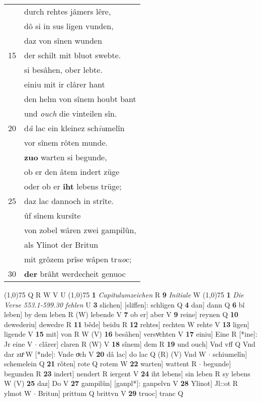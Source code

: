 \documentclass[8pt,a4paper,notitlepage]{article}
\begin{document}
\begin{table}[ht]
\begin{minipage}[t]{0.5\linewidth}
\begin{tabular}{rl}
 & durch rehtes jâmers lêre,\\ 
 & dô si in sus ligen vunden,\\ 
 & daz von sînen wunden\\ 
15 & der schilt mit bluot swebte.\\ 
 & si besâhen, ober lebte.\\ 
 & einiu mit ir clârer hant\\ 
 & den helm von sînem houbt bant\\ 
 & und \textit{ouch} die vinteilen sîn.\\ 
20 & d\textit{â} lac ein kleinez sch\textit{iu}melîn\\ 
 & vor sînem rôten munde.\\ 
 & \textbf{zuo} warten si begunde,\\ 
 & ob er den âtem indert züge\\ 
 & oder ob er \textbf{iht} lebens trüge;\\ 
25 & daz lac dannoch in strîte.\\ 
 & ûf sînem kursîte\\ 
 & von zobel wâren zwei gampilûn,\\ 
 & als Ylinot der Britun\\ 
 & mit grôzem prîse wâpen tr\textit{uo}c;\\ 
30 & \textbf{der} brâht werdecheit genuoc\\ 
\end{tabular}
\scriptsize
\line(1,0){75} \newline
Q R W V U \newline
\line(1,0){75} \newline
\textbf{1} \textit{Capitulumzeichen} R  \textbf{9} \textit{Initiale} W  \newline
\line(1,0){75} \newline
\textbf{1} \textit{Die Verse 553.1-599.30 fehlen} U  \textbf{3} slichen] [sliffen]: schligen Q \textbf{4} dan] dann Q \textbf{6} bî leben] by dem leben R (W) lebende V \textbf{7} ob er] aber V \textbf{9} reine] reynen Q \textbf{10} dewederiu] dewedre R \textbf{11} bêde] beidu R \textbf{12} rehtes] rechten W rehte V \textbf{13} ligen] ligende V \textbf{15} mit] von R W (V) \textbf{16} besâhen] versvͦchten V \textbf{17} einiu] Eine R [*ine]: Jr eine V  $\cdot$ clârer] claren R (W) V \textbf{18} sînem] dem R \textbf{19} und ouch] Vnd vff Q Vnd dar zuͦ W [*nde]: Vnde oͮch V \textbf{20} dâ lac] do lac Q (R) (V) Vnd W  $\cdot$ schiumelîn] schemelein Q \textbf{21} rôten] rote Q rotem W \textbf{22} warten] wattent R  $\cdot$ begunde] begunden R \textbf{23} indert] nendert R iergent V \textbf{24} iht lebens] sin leben R sy lebens W (V) \textbf{25} daz] Do V \textbf{27} gampilûn] [ganpl*]: ganpelvn V \textbf{28} Ylinot] Jl::ot R ylmot W  $\cdot$ Britun] prittum Q brittvn V \textbf{29} truoc] tranc Q \newline
\end{minipage}
\end{table}
\end{document}
